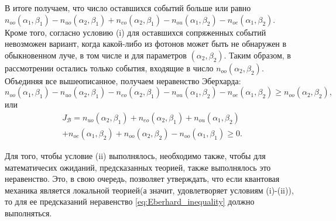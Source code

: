 \documentclass[%
master,         %
subf,           %
href,           %
colorlinks=true %
]{disser}
\numberwithin{equation}{section}
\numberwithin{figure}{section}
\begin{document}
В итоге получаем, что число оставшихся событий больше или равно $n_{oo}(\alpha_1, \beta_1) - n_{uo}(\alpha_2, \beta_1) + n_{eo}(\alpha_2, \beta_1) - n_{ou}(\alpha_1, \beta_2) - n_{oe}(\alpha_1, \beta_2)$. Кроме того, согласно условию (i) для оставшихся сопряженных событий невозможен вариант, когда какой-либо из фотонов может быть не обнаружен в обыкновенном луче, в том числе и для параметров $(\alpha_2, \beta_2)$. Таким образом, в рассмотрении остались только события, входящие в число $n_{oo}(\alpha_2, \beta_2)$. Объединяя все вышеописанное, получаем неравенство Эберхарда:
\[
n_{oo}(\alpha_1, \beta_1) - n_{uo}(\alpha_2, \beta_1) - n_{eo}(\alpha_2, \beta_1) - n_{ou}(\alpha_1, \beta_2) - n_{oe}(\alpha_1, \beta_2) \geq n_{oo}(\alpha_2, \beta_2),
\]
или
\begin{multline}
J_{\mathcal{B}} = n_{uo}(\alpha_2, \beta_1) + n_{eo}(\alpha_2, \beta_1) + n_{ou}(\alpha_1, \beta_2) \\
+ n_{oe}(\alpha_1, \beta_2) + n_{oo}(\alpha_2, \beta_2) - n_{oo}(\alpha_1, \beta_1) \geq 0.
\label{eq:Eberhard_inequality}
\end{multline}

Для того, чтобы условие (ii) выполнялось, необходимо также, чтобы для математичесих ожиданий, предсказанных теорией, также выполнялось это неравенство. Это, в свою очередь, позволяет утверждать, что если квантовая механика является локальной теорией(а значит, удовлетворяет условиям (i)-(ii)), то для ее предсказаний неравенство \eqref{eq:Eberhard_inequality} должно выполняться.
\end{document}
